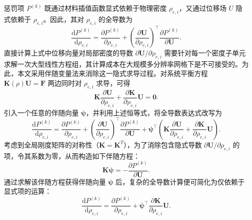 惩罚项 $P^{(k)}$ 既通过材料插值函数显式依赖于物理密度 $\rho_{e,i}$，又通过位移场 $U$ 隐式依赖于 $\rho_{e,i}$。因此，其对 $\rho_{e,i}$ 的全导数为
\[
\frac{\mathrm{d}P^{(k)}}{\mathrm{d}\rho_{e,i}} = \frac{\partial P^{(k)}}{\partial\rho_{e,i}} + \left(\frac{\partial \boldsymbol{U}}{\partial\rho_{e,i}}\right)^{\top}\frac{\partial P^{(k)}}{\partial \boldsymbol{U}}.
\]
直接计算上式中位移向量对局部密度的导数 $\partial \boldsymbol{U}/\partial\rho_{e,i}$ 需要针对每一个密度子单元求解一次大型线性方程组，其计算成本在大规模多分辨率网格下是不可接受的。为此，本文采用伴随变量法来消除这一隐式求导过程。对系统平衡方程 $\boldsymbol{K}(\rho)\boldsymbol{U}=\boldsymbol{F}$ 两边同时对 $\rho_{e,i}$ 求导，可得
\[
\boldsymbol{K}\frac{\partial \boldsymbol{U}}{\partial\rho_{e,i}} + \frac{\partial \boldsymbol{K}}{\partial\rho_{e,i}}\boldsymbol{U} = \boldsymbol{0}.
\]
引入一个任意的伴随向量 $\boldsymbol{\psi}$，并利用上述恒等式，将全导数表达式改写为
\[
\frac{\mathrm{d} P^{(k)}}{\mathrm{d} \rho_{e,i}} = \frac{\partial P^{(k)}}{\partial \rho_{e,i}} + \left( \frac{\partial \boldsymbol{U}}{\partial \rho_{e,i}} \right)^{\!\top} \frac{\partial P^{(k)}}{\partial \boldsymbol{U}} + \boldsymbol{\psi}^{\top} \left( \boldsymbol{K} \frac{\partial \boldsymbol{U}}{\partial \rho_{e,i}} + \frac{\partial \boldsymbol{K}}{\partial \rho_{e,i}} \boldsymbol{U} \right).
\]
考虑到全局刚度矩阵的对称性（$\boldsymbol{K} = \boldsymbol{K}^T$），为了消除包含隐式导数 $\partial \boldsymbol{U}/\partial\rho_{e,i}$ 的项，令其系数为零，从而构造如下伴随方程：
\begin{equation} \label{eq:ch4_adjoint_equation}
	\boldsymbol{K}\boldsymbol{\psi} = -\frac{\partial P^{(k)}}{\partial \boldsymbol{U}}.
\end{equation}
通过求解该伴随方程获得伴随向量 $\boldsymbol{\psi}$ 后，复杂的全导数计算便可简化为仅依赖于显式项的运算：
\[
\frac{\mathrm{d}P^{(k)}}{\mathrm{d}\rho_{e,i}} = \frac{\partial P^{(k)}}{\partial\rho_{e,i}} + \boldsymbol{\psi}^{\top}\frac{\partial \boldsymbol{K}}{\partial\rho_{e,i}}\boldsymbol{U}.
\]

